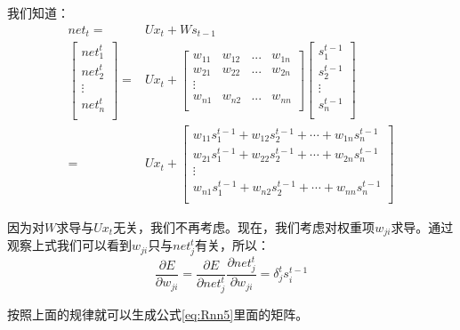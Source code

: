 我们知道：
\begin{align*}
	{net}_t=                    & U{x}_t+W{s}_{t-1} \\
	\begin{bmatrix}
		net_1^t \\
		net_2^t \\
		\vdots  \\
		net_n^t \\
	\end{bmatrix}= & U{x}_t+
	\begin{bmatrix}
		w_{11} & w_{12} & ... & w_{1n} \\
		w_{21} & w_{22} & ... & w_{2n} \\
		\vdots                         \\
		w_{n1} & w_{n2} & ... & w_{nn} \\
	\end{bmatrix}
	\begin{bmatrix}
		s_1^{t-1} \\
		s_2^{t-1} \\
		\vdots    \\
		s_n^{t-1} \\
	\end{bmatrix}                      \\
	=                           & U{x}_t+
	\begin{bmatrix}
		w_{11}s_1^{t-1}+w_{12}s_2^{t-1} + \cdots + w_{1n}s_n^{t-1} \\
		w_{21}s_1^{t-1}+w_{22}s_2^{t-1} + \cdots + w_{2n}s_n^{t-1} \\
		\vdots                                                     \\
		w_{n1}s_1^{t-1}+w_{n2}s_2^{t-1} + \cdots + w_{nn}s_n^{t-1} \\
	\end{bmatrix}
\end{align*}


因为对$W$求导与\(U{x}_t\)无关，我们不再考虑。现在，我们考虑对权重项\(w_{ji}\)求导。通过观察上式我们可以看到\(w_{ji}\)只与\(net_j^t\)有关，所以：
\[
	\frac{\partial{E}}{\partial{w_{ji}}}=\frac{\partial{E}}{\partial{net_j^t}}\frac{\partial{net_j^t}}{\partial{w_{ji}}}=\delta_j^ts_i^{t-1}
\]


按照上面的规律就可以生成公式\ref{eq:Rnn5}里面的矩阵。


